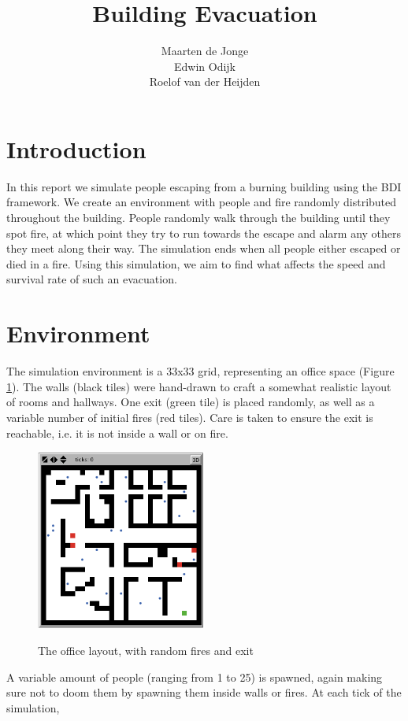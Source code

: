 \documentclass[a4paper]{article}
\title{Building Evacuation}
\author{Maarten de Jonge \\
        Edwin Odijk \\
        Roelof van der Heijden}
\begin{document}
\maketitle

\section{Introduction}
In this report we simulate people escaping from a burning building using the BDI framework. We create an environment with people and fire randomly distributed throughout the building. People randomly walk through the building until they spot fire, at which point they try to run towards the escape and alarm any others they meet along their way. The simulation ends when all people either escaped or died in a fire.
Using this simulation, we aim to find what affects the speed and survival rate of such an evacuation.

\section{Environment}
\FloatBarrier
The simulation environment is a 33x33 grid, representing an office space (Figure
\ref{fig:office}). The walls (black tiles) were hand-drawn to craft a somewhat
realistic layout of rooms and hallways. One exit (green tile) is placed
randomly, as well as a variable number of initial fires (red tiles). Care is
taken to ensure the exit is reachable, i.e. it is not inside a wall or on fire.

\begin{figure}[h!]
  \centering
  \includegraphics[width=0.5\textwidth]{office.png}
  \label{fig:office}
  \caption{The office layout, with random fires and exit}
\end{figure}

A variable amount of people (ranging from 1 to 25) is spawned, again making sure
not to doom them by spawning them inside walls or fires. At each tick of the
simulation, 
\end{document}
